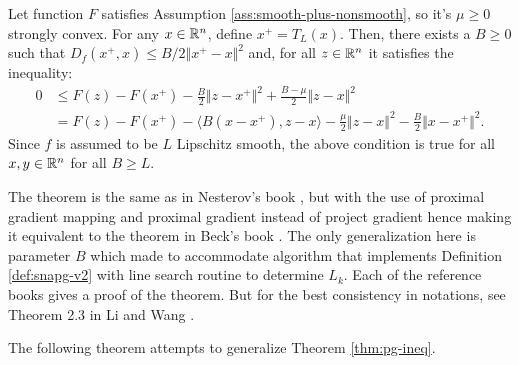 \documentclass[12pt]{article}
\begin{document}
            \begin{theorem}\label{thm:pg-ineq}
                Let function $F$ satisfies Assumption \ref{ass:smooth-plus-nonsmooth}, so it's $\mu \ge 0$ strongly convex. 
                For any $x\in \mathbb R^n$, define $x^+ = T_L(x)$. 
                Then, there exists a $B \ge 0$ such that $D_f(x^+, x) \le B/2 \Vert x^+ - x\Vert^2$ and, for all $z \in \mathbb R^n$ it satisfies the inequality: 
                \begin{align*}
                    0&\le F(z) - F(x^+) - \frac{B}{2}\Vert z - x^+\Vert^2  + \frac{B - \mu}{2}\Vert z - x\Vert^2
                    \\
                    &=  F(z) - F(x^+) - \langle B(x - x^+), z - x\rangle
                    - \frac{\mu}{2}\Vert z - x\Vert^2
                    - \frac{B}{2}\Vert x - x^+\Vert^2. 
                \end{align*}
                Since $f$ is assumed to be $L$ Lipschitz smooth, the above condition is true for all $x, y \in \mathbb R^n$ for all $B \ge L$. 
            \end{theorem}
            \begin{remark}
                The theorem is the same as in Nesterov's book \cite[Theorem 2.2.13]{nesterov_lectures_2018}, but with the use of proximal gradient mapping and proximal gradient instead of project gradient hence making it equivalent to the theorem in Beck's book \cite[Theorem 10.16]{beck_first-order_2017}. 
                The only generalization here is parameter $B$ which made to accommodate algorithm that implements Definition \ref{def:snapg-v2} with line search routine to determine $L_k$. 
                Each of the reference books gives a proof of the theorem. 
                But for the best consistency in notations, see Theorem 2.3 in Li and Wang \cite{li_relaxed_2025}. 
            \end{remark}
            The following theorem attempts to generalize Theorem \ref{thm:pg-ineq}. 
\end{document}

